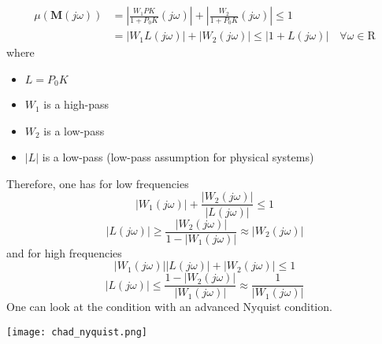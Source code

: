 \begin{align*}
    \mu(\mathbf{M}(j\omega)) & =\left|\frac{W_1PK}{1+P_0K}(j\omega)\right|+\left|\frac{W_2}{1+P_0K}(j\omega)\right|\leq1 \\
                             & =|W_1L(j\omega)|+|W_2(j\omega)|\leq|1+L(j\omega)|\quad\forall\omega\in\mathrm{R}
\end{align*}
where
\begin{itemize}
    \item $L=P_0K$
    \item $W_1$ is a high-pass
    \item $W_2$ is a low-pass
    \item $|L|$ is a low-pass (low-pass assumption for physical systems)
\end{itemize}
Therefore, one has for low frequencies
\begin{equation*}
    |W_1(j\omega)|+\frac{|W_2(j\omega)|}{|L(j\omega)|}\leq1
\end{equation*}
\begin{equation*}
    |L(j\omega)|\geq\frac{|W_2(j\omega)|}{1-|W_1(j\omega)|}\approx|W_2(j\omega)|
\end{equation*}
and for high frequencies
\begin{equation*}
    |W_1(j\omega)||L(j\omega)|+|W_2(j\omega)|\leq1
\end{equation*}
\begin{equation*}
    |L(j\omega)|\leq\frac{1-|W_2(j\omega)|}{|W_1(j\omega)|}\approx\frac1{|W_1(j\omega)|}
\end{equation*}
One can look at the condition with an advanced Nyquist condition.
\begin{center}
    \texttt{[image: chad\_nyquist.png]}
\end{center}

